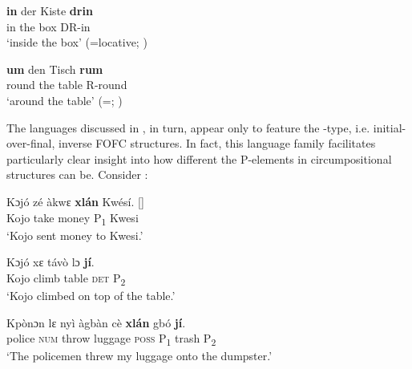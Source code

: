 \documentclass[output=paper]{LSP/langsci}
\begin{document}
\ea%
    \label{ex:biberauer:53}
    

	 \ea
\gll  \textbf{in} der Kiste \textbf{drin} \\
in the box    DR-in\\
\glt ‘inside the box’      (=locative; \citealt[164]{Noonan2010})



 \ex
\gll   \textbf{um}     den Tisch  \textbf{rum}\\
   round the   table  R-round\\
  \glt ‘around the table’      (=; \citealt[169]{Noonan2010})
\z
\z


The  languages discussed in \citet{Aboh2005,Aboh2010}, in turn, appear only to feature the -type, i.e. initial-over-final, inverse FOFC structures. In fact, this language family facilitates particularly clear insight into how different the P-elements in circumpositional structures can be. Consider :



\ea%
    \label{ex:biberauer:54}
  	 \ea
\gll  Kɔjó zé    àkwɛ   \textbf{xlán} Kwésí.          []\\
    Kojo take money P\textsubscript{1}   Kwesi\\
  \glt ‘Kojo sent money to Kwesi.’



 \ex
\gll  Kɔjó  xɛ      távò  lɔ    \textbf{jí}.\\
    Kojo climb table \textsc{det} P\textsubscript{2}\\
\glt ‘Kojo climbed on top of the table.’

\ex
\gll  Kpònɔn lɛ     nyì     àgbàn    cè     \textbf{xlán} gbó    \textbf{jí}.\\
 police   \textsc{num} throw luggage \textsc{poss} P\textsubscript{1}     trash P\textsubscript{2}\\
\glt ‘The policemen threw my luggage onto the dumpster.’
\citep[227]{Aboh2010}
\z
\z
\end{document}
